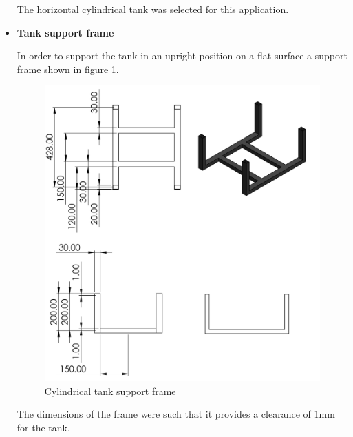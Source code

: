 \begin{itemize}
The horizontal cylindrical tank was selected for this application.
\par
\item \textbf{Tank support frame}
\par
In order to support the tank in an upright position on a flat surface a support frame shown in figure \ref{fig:cylindrical_tank_support_frame}.

\begin{figure}[H]
    \centering
    \includegraphics{Figures/tankHolder.PNG}
    \caption{Cylindrical tank support frame}
    \label{fig:cylindrical_tank_support_frame}
\end{figure}

The dimensions of the frame were such that it provides a clearance of 1mm for the tank.


\end{itemize}

